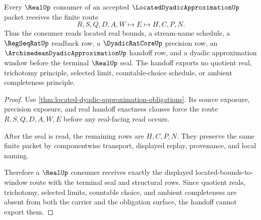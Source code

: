 \begin{theorem}
\label{thm:located-dyadic-approximation-real-handoff}
Every $\RealUp$ consumer of an accepted $\LocatedDyadicApproximationUp$ packet receives the finite route
$$
R,S,Q,D,A,W \longmapsto E \longmapsto H,C,P,N .
$$
Thus the consumer reads located real bounds, a stream-name schedule, a $\RegSeqRatUp$ readback row, a $\DyadicRatCoreUp$ precision row, an $\ArchimedeanDyadicApproximationUp$ handoff row, and a dyadic approximation window before the terminal $\RealUp$ seal. The handoff exports no quotient real, trichotomy principle, selected limit, countable-choice schedule, or ambient completeness principle.
\end{theorem}
\begin{proof}
Use \autoref{thm:located-dyadic-approximation-obligations}. Its source exposure, precision exposure, and real handoff exactness clauses force the route $R,S,Q,D,A,W,E$ before any real-facing read occurs.

After the seal is read, the remaining rows are $H,C,P,N$. They preserve the same finite packet by componentwise transport, displayed replay, provenance, and local naming.

Therefore a $\RealUp$ consumer receives exactly the displayed located-bounds-to-window route with the terminal seal and structural rows. Since quotient reals, trichotomy, selected limits, countable choice, and ambient completeness are absent from both the carrier and the obligation surface, the handoff cannot export them.
\end{proof}


\begin{closurestatus}{\LocatedDyadicApproximationUp}
  \theoryclosure{\seedClosure}
  \formalstatus{\unformalizedV}
\end{closurestatus}
